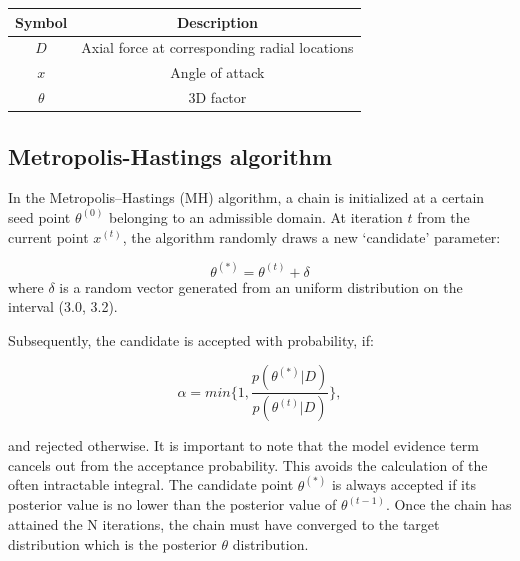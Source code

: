 \documentclass[11pt]{article}
\begin{document}
\begin{center}
\begin{tabular}{ |c|c| } 
 \hline
 Symbol & Description  \\ 
 \hline
$D$ & Axial force at corresponding radial locations   \\ 
 $x$ & Angle of attack  \\ 
 $\theta$ & 3D factor\\
 \hline
\end{tabular}
\end{center}

\subsection{Metropolis-Hastings algorithm}


In the Metropolis–Hastings (MH) algorithm, a chain is initialized at a certain seed point $\theta^{(0)}$  belonging to an admissible domain. At iteration $t$ from the current point $x^{(t)}$, the algorithm randomly draws a new `candidate' parameter:

    \begin{equation*}
        \theta^{(*)} = \theta^{(t)} + \delta
    \end{equation*}
    \noindent where $\delta$ is a random vector generated from an uniform distribution on the interval (3.0,  3.2).
    
    Subsequently, the candidate is accepted with probability, if:
    
    \begin{equation*}
        \alpha = min \bigg\{1, \frac{p(\theta^{(*)}|D)}{p(\theta^{(t)}|D)}\bigg\},
    \end{equation*}
    
    
    \noindent and rejected otherwise. It is important to note that the model evidence term cancels out from the acceptance probability. This avoids the calculation of the often intractable
integral. The candidate point $\theta^{(*)}$ is always accepted if its posterior value is no lower than the posterior value of $\theta^{(t-1)}$. Once the chain has attained the
N iterations, the chain must have converged to the target distribution
which is the posterior $\theta$ distribution.
\end{document}

